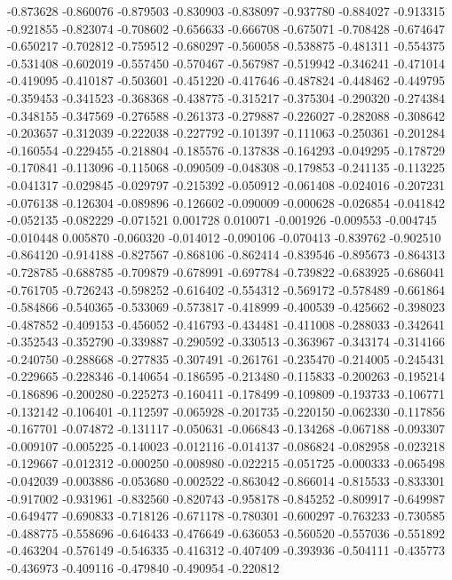 -0.873628
-0.860076
-0.879503
-0.830903
-0.838097
-0.937780
-0.884027
-0.913315
-0.921855
-0.823074
-0.708602
-0.656633
-0.666708
-0.675071
-0.708428
-0.674647
-0.650217
-0.702812
-0.759512
-0.680297
-0.560058
-0.538875
-0.481311
-0.554375
-0.531408
-0.602019
-0.557450
-0.570467
-0.567987
-0.519942
-0.346241
-0.471014
-0.419095
-0.410187
-0.503601
-0.451220
-0.417646
-0.487824
-0.448462
-0.449795
-0.359453
-0.341523
-0.368368
-0.438775
-0.315217
-0.375304
-0.290320
-0.274384
-0.348155
-0.347569
-0.276588
-0.261373
-0.279887
-0.226027
-0.282088
-0.308642
-0.203657
-0.312039
-0.222038
-0.227792
-0.101397
-0.111063
-0.250361
-0.201284
-0.160554
-0.229455
-0.218804
-0.185576
-0.137838
-0.164293
-0.049295
-0.178729
-0.170841
-0.113096
-0.115068
-0.090509
-0.048308
-0.179853
-0.241135
-0.113225
-0.041317
-0.029845
-0.029797
-0.215392
-0.050912
-0.061408
-0.024016
-0.207231
-0.076138
-0.126304
-0.089896
-0.126602
-0.090009
-0.000628
-0.026854
-0.041842
-0.052135
-0.082229
-0.071521
0.001728
0.010071
-0.001926
-0.009553
-0.004745
-0.010448
0.005870
-0.060320
-0.014012
-0.090106
-0.070413
-0.839762
-0.902510
-0.864120
-0.914188
-0.827567
-0.868106
-0.862414
-0.839546
-0.895673
-0.864313
-0.728785
-0.688785
-0.709879
-0.678991
-0.697784
-0.739822
-0.683925
-0.686041
-0.761705
-0.726243
-0.598252
-0.616402
-0.554312
-0.569172
-0.578489
-0.661864
-0.584866
-0.540365
-0.533069
-0.573817
-0.418999
-0.400539
-0.425662
-0.398023
-0.487852
-0.409153
-0.456052
-0.416793
-0.434481
-0.411008
-0.288033
-0.342641
-0.352543
-0.352790
-0.339887
-0.290592
-0.330513
-0.363967
-0.343174
-0.314166
-0.240750
-0.288668
-0.277835
-0.307491
-0.261761
-0.235470
-0.214005
-0.245431
-0.229665
-0.228346
-0.140654
-0.186595
-0.213480
-0.115833
-0.200263
-0.195214
-0.186896
-0.200280
-0.225273
-0.160411
-0.178499
-0.109809
-0.193733
-0.106771
-0.132142
-0.106401
-0.112597
-0.065928
-0.201735
-0.220150
-0.062330
-0.117856
-0.167701
-0.074872
-0.131117
-0.050631
-0.066843
-0.134268
-0.067188
-0.093307
-0.009107
-0.005225
-0.140023
-0.012116
-0.014137
-0.086824
-0.082958
-0.023218
-0.129667
-0.012312
-0.000250
-0.008980
-0.022215
-0.051725
-0.000333
-0.065498
-0.042039
-0.003886
-0.053680
-0.002522
-0.863042
-0.866014
-0.815533
-0.833301
-0.917002
-0.931961
-0.832560
-0.820743
-0.958178
-0.845252
-0.809917
-0.649987
-0.649477
-0.690833
-0.718126
-0.671178
-0.780301
-0.600297
-0.763233
-0.730585
-0.488775
-0.558696
-0.646433
-0.476649
-0.636053
-0.560520
-0.557036
-0.551892
-0.463204
-0.576149
-0.546335
-0.416312
-0.407409
-0.393936
-0.504111
-0.435773
-0.436973
-0.409116
-0.479840
-0.490954
-0.220812

